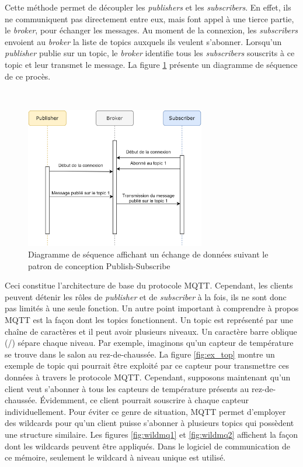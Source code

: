 \noindent
Cette méthode permet de découpler les \textit{publishers} et les \textit{subscribers}. En effet, ils ne communiquent pas directement entre eux, mais font appel à une tierce partie, le \textit{broker}, pour échanger les messages. Au moment de la connexion, les \textit{subscribers} envoient au \textit{broker} la liste de topics auxquels ils veulent s'abonner. Lorsqu'un \textit{publisher} publie sur un topic, le \textit{broker} identifie tous les \textit{subscribers} souscrits à ce topic et leur transmet le message. La figure \ref{fig:pub_sub_seq} présente un diagramme de séquence de ce procès.

~

\begin{figure}[ht!]
  \centering
  \includegraphics[width=0.7\textwidth]{img/app/process_pub_sub.png}
  \caption{Diagramme de séquence affichant un échange de données suivant le patron de conception Publish-Subscribe}
  \label{fig:pub_sub_seq}
\end{figure}


\noindent
Ceci constitue l'architecture de base du protocole MQTT. Cependant, les clients peuvent détenir les rôles de \textit{publisher} et de \textit{subscriber} à la fois, ils ne sont donc pas limités à une seule fonction. Un autre point important à comprendre à propos MQTT est la façon dont les topics fonctionnent. Un topic est représenté par une chaîne de caractères et il peut avoir plusieurs niveaux. Un caractère barre oblique (/) sépare chaque niveau. Par exemple, imaginons qu'un capteur de température se trouve dans le salon au rez-de-chaussée. La figure \ref{fig:ex_top} montre un exemple de topic qui pourrait être exploité par ce capteur pour transmettre ces données à travers le protocole MQTT. Cependant, supposons maintenant qu'un client veut s'abonner à tous les capteurs de température présents au rez-de-chaussée. Évidemment, ce client pourrait souscrire à chaque capteur individuellement. Pour éviter ce genre de situation, MQTT permet d'employer des wildcards pour qu'un client puisse s'abonner à plusieurs topics qui possèdent une structure similaire. Les figures \ref{fig:wildmq1} et \ref{fig:wildmq2} affichent la façon dont les wildcards peuvent être appliqués. Dans le logiciel de communication de ce mémoire, seulement le wildcard à niveau unique est utilisé.

